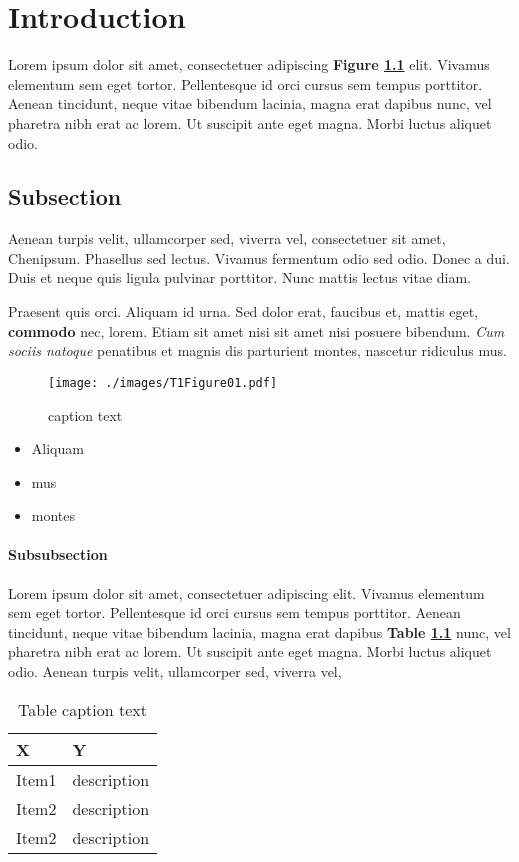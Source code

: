 \chapter{Introduction}
Lorem ipsum dolor sit amet, consectetuer adipiscing \textbf{Figure \ref{fig:model}} elit. Vivamus elementum sem eget tortor. Pellentesque id orci cursus sem tempus porttitor. Aenean tincidunt, neque vitae bibendum lacinia, magna erat dapibus nunc, vel pharetra nibh erat ac lorem. Ut suscipit ante eget magna. Morbi luctus aliquet odio. 

\section{Subsection}
Aenean turpis velit, ullamcorper sed, viverra vel, consectetuer sit amet, \cite{KunChen2005} Chenipsum. Phasellus sed lectus. Vivamus fermentum odio sed odio. Donec a dui. Duis et neque quis ligula pulvinar porttitor. Nunc mattis lectus vitae diam. 

Praesent quis orci. Aliquam id urna. Sed dolor erat, faucibus et, mattis eget, \textbf{commodo} nec, lorem. Etiam sit amet nisi sit amet nisi posuere bibendum. \emph{Cum sociis natoque} penatibus et magnis dis parturient montes, nascetur ridiculus mus. 


\begin{figure}
\centering
\texttt{[image: ./images/T1Figure01.pdf]} 
\caption{caption text}
\label{fig:model}
\end{figure}

\begin{itemize}
\item Aliquam
\item mus
\item montes
\end{itemize}

\subsubsection{Subsubsection}
Lorem ipsum dolor sit amet, consectetuer adipiscing elit. Vivamus elementum sem eget tortor. Pellentesque id orci cursus sem tempus porttitor. Aenean tincidunt, neque vitae bibendum lacinia, magna erat dapibus \textbf{Table \ref{tab:table}} nunc, vel pharetra nibh erat ac lorem. Ut suscipit ante eget magna. Morbi luctus aliquet odio. Aenean turpis velit, ullamcorper sed, viverra vel, 

 \begin{table} [t] 
\centering
\begin{small}
\caption{Table caption text}
\label{tab:table}
\setlength{\tabcolsep}{1em}
\begin{tabular}{ l| p{8cm}}
\hline
 \textbf{X} & \textbf{ Y} \\
\hline
 \hline	
 Item1 & description\\
 \hline
  Item2 & description  \\
 \hline
  Item2 & description \\
 \hline
\end{tabular}
\end{small}
\end{table}



